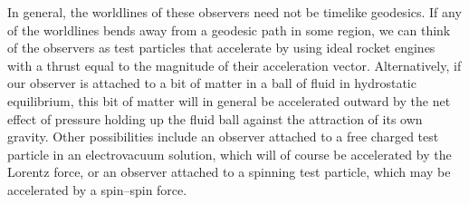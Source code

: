 In general, the worldlines of these observers need not be timelike geodesics. If any of the worldlines bends away from a geodesic path in some region, we can think of the observers as test particles that accelerate by using ideal rocket engines with a thrust equal to the magnitude of their acceleration vector. Alternatively, if our observer is attached to a bit of matter in a ball of fluid in hydrostatic equilibrium, this bit of matter will in general be accelerated outward by the net effect of pressure holding up the fluid ball against the attraction of its own gravity. Other possibilities include an observer attached to a free charged test particle in an electrovacuum solution, which will of course be accelerated by the Lorentz force, or an observer attached to a spinning test particle, which may be accelerated by a spin–spin force.\\

